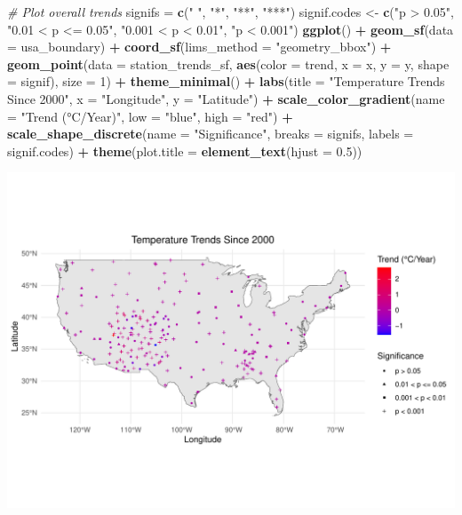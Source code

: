 \documentclass[
]{article}
\newenvironment{Shaded}{\begin{snugshade}}{\end{snugshade}}
\newcommand{\AttributeTok}[1]{\textcolor[rgb]{0.13,0.29,0.53}{#1}}
\newcommand{\CommentTok}[1]{\textcolor[rgb]{0.56,0.35,0.01}{\textit{#1}}}
\newcommand{\DecValTok}[1]{\textcolor[rgb]{0.00,0.00,0.81}{#1}}
\newcommand{\FloatTok}[1]{\textcolor[rgb]{0.00,0.00,0.81}{#1}}
\newcommand{\FunctionTok}[1]{\textcolor[rgb]{0.13,0.29,0.53}{\textbf{#1}}}
\newcommand{\NormalTok}[1]{#1}
\newcommand{\OtherTok}[1]{\textcolor[rgb]{0.56,0.35,0.01}{#1}}
\newcommand{\SpecialCharTok}[1]{\textcolor[rgb]{0.81,0.36,0.00}{\textbf{#1}}}
\newcommand{\StringTok}[1]{\textcolor[rgb]{0.31,0.60,0.02}{#1}}
\begin{document}
\begin{Shaded}
\begin{Highlighting}[]
\CommentTok{\# Plot overall trends}
\NormalTok{signifs }\OtherTok{=} \FunctionTok{c}\NormalTok{(}\StringTok{" "}\NormalTok{, }\StringTok{"*"}\NormalTok{, }\StringTok{"**"}\NormalTok{, }\StringTok{"***"}\NormalTok{)}
\NormalTok{signif.codes }\OtherTok{\textless{}{-}} \FunctionTok{c}\NormalTok{(}\StringTok{"p \textgreater{} 0.05"}\NormalTok{, }\StringTok{"0.01 \textless{} p \textless{}= 0.05"}\NormalTok{, }\StringTok{"0.001 \textless{} p \textless{} 0.01"}\NormalTok{, }
                  \StringTok{"p \textless{} 0.001"}\NormalTok{)}
\FunctionTok{ggplot}\NormalTok{() }\SpecialCharTok{+}
  \FunctionTok{geom\_sf}\NormalTok{(}\AttributeTok{data =}\NormalTok{ usa\_boundary) }\SpecialCharTok{+}
  \FunctionTok{coord\_sf}\NormalTok{(}\AttributeTok{lims\_method =} \StringTok{"geometry\_bbox"}\NormalTok{) }\SpecialCharTok{+}
  \FunctionTok{geom\_point}\NormalTok{(}\AttributeTok{data =}\NormalTok{ station\_trends\_sf, }
             \FunctionTok{aes}\NormalTok{(}\AttributeTok{color =}\NormalTok{ trend, }\AttributeTok{x =}\NormalTok{ x, }\AttributeTok{y =}\NormalTok{ y, }\AttributeTok{shape =}\NormalTok{ signif), }
             \AttributeTok{size =} \DecValTok{1}\NormalTok{) }\SpecialCharTok{+} \FunctionTok{theme\_minimal}\NormalTok{() }\SpecialCharTok{+}
  \FunctionTok{labs}\NormalTok{(}\AttributeTok{title =} \StringTok{"Temperature Trends Since 2000"}\NormalTok{, }
       \AttributeTok{x =} \StringTok{"Longitude"}\NormalTok{, }\AttributeTok{y =} \StringTok{"Latitude"}\NormalTok{) }\SpecialCharTok{+}
  \FunctionTok{scale\_color\_gradient}\NormalTok{(}\AttributeTok{name =} \StringTok{"Trend (°C/Year)"}\NormalTok{, }\AttributeTok{low =} \StringTok{"blue"}\NormalTok{, }\AttributeTok{high =} \StringTok{"red"}\NormalTok{) }\SpecialCharTok{+}
  \FunctionTok{scale\_shape\_discrete}\NormalTok{(}\AttributeTok{name =} \StringTok{"Significance"}\NormalTok{, }\AttributeTok{breaks =}\NormalTok{ signifs, }
                                \AttributeTok{labels =}\NormalTok{ signif.codes) }\SpecialCharTok{+}
  \FunctionTok{theme}\NormalTok{(}\AttributeTok{plot.title =} \FunctionTok{element\_text}\NormalTok{(}\AttributeTok{hjust =} \FloatTok{0.5}\NormalTok{))}
\end{Highlighting}
\end{Shaded}

\includegraphics{seesaw_files/figure-latex/unnamed-chunk-10-1.pdf}
\end{document}
